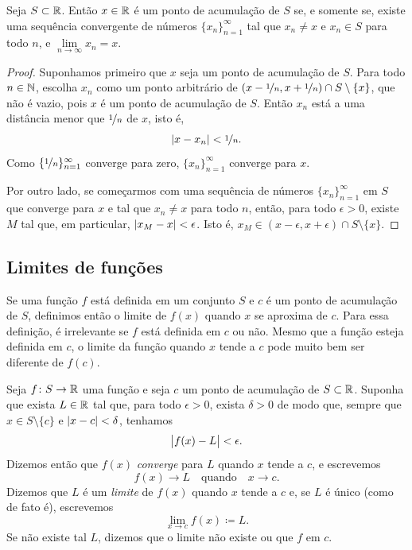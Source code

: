 \begin{prop}
Seja $S \subset {\mathbb{R}}$. Então $x \in {\mathbb{R}}$ é um ponto de acumulação de $S$
se, e somente se,
existe uma sequência convergente de números $\{ x_n \}_{n=1}^\infty$ tal que
$x_n \neq x$ e $x_n \in S$ para todo $n$, e $\lim\limits_{n\to\infty} x_n = x$.
\end{prop}

\begin{proof}
Suponhamos primeiro que $x$ seja um ponto de acumulação de $S$.
Para todo $n \in {\mathbb{N}}$, escolha $x_n$ como um ponto arbitrário de
$(x-\nicefrac{1}{n},x+\nicefrac{1}{n}) \cap S \setminus \{x\}$, que
não é vazio, pois $x$ é um ponto de acumulação de $S$.
Então
$x_n$ está a uma distância menor que $\nicefrac{1}{n}$ de $x$, isto é,
\begin{equation*}
\sabs{x-x_n} < \nicefrac{1}{n} .
\avoidbreak
\end{equation*}
Como $\{ \nicefrac{1}{n} \}_{n=1}^\infty$ converge para zero,
$\{ x_n \}_{n=1}^\infty$ converge para $x$.

Por outro lado, se começarmos com uma sequência de números
$\{ x_n \}_{n=1}^\infty$ em $S$
que converge para $x$ e tal que $x_n \neq x$ para todo $n$, então, para todo
$\epsilon > 0$, existe $M$ tal que, em particular, $\lvert {x_M - x} \rvert <
\epsilon$. Isto é, $x_M \in (x-\epsilon,x+\epsilon) \cap S \setminus \{x\}$.
\end{proof}

\subsection{Limites de funções}

Se uma função $f$ está definida em um conjunto $S$ e $c$ é um ponto de
acumulação de $S$, definimos então o limite de $f(x)$ quando $x$ se aproxima de $c$.
Para essa definição, é irrelevante se $f$ está definida em $c$ ou não.
Mesmo que a função esteja definida em $c$, o limite da função quando $x$ tende a
$c$ pode muito bem ser diferente de $f(c)$.

\begin{defn}
%
Seja $f \colon S \to {\mathbb{R}}$ uma função e seja $c$ um ponto de acumulação de
$S \subset {\mathbb{R}}$.
Suponha que exista $L \in {\mathbb{R}}$ tal que, para todo $\epsilon > 0$,
exista $\delta > 0$ de modo que, sempre que $x \in S \setminus \{ c \}$
e $\lvert {x - c} \rvert < \delta$, tenhamos
\begin{equation*}
\bigl\lvert {f(x) - L} \bigr\rvert < \epsilon .
\end{equation*}
Dizemos então que $f(x)$ \emph{converge} para $L$ quando $x$ tende
a $c$, e escrevemos
%
\begin{equation*}
f(x) \to L \quad\text{quando}\quad x \to c .
\end{equation*}
Dizemos que $L$ é um \emph{limite} de $f(x)$ quando $x$
tende a $c$ e, se $L$ é único (como de fato é), escrevemos
%
\begin{equation*}
\lim_{x \to c} f(x) \coloneqq L .
\end{equation*}
Se não existe tal $L$, dizemos que o limite não existe ou
que $f$ \emph{} em $c$.
\end{defn}

